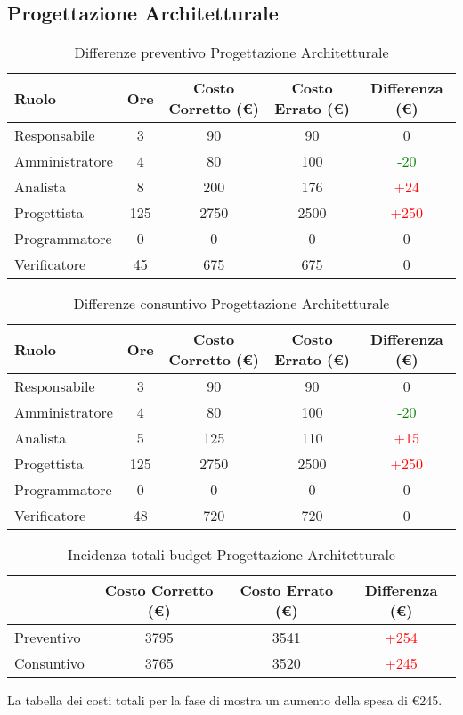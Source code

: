 \subsection{Progettazione Architetturale}
\begin{table}[h]
\begin{center}
\begin{tabular}{|l|c|c|c|c|}
\hline Ruolo & Ore & Costo Corretto (\euro) & Costo Errato (\euro) & Differenza (\euro) \\
\hline
Responsabile & 3 & 90  & 90 & 0\\
Amministratore & 4 & 80 & 100 & \textcolor{Green}{-20}\\
Analista &  8 & 200 & 176 & \textcolor{red}{+24}\\
Progettista & 125 & 2750 & 2500 & \textcolor{red}{+250}\\
Programmatore & 0 & 0 & 0 & 0\\
Verificatore & 45 & 675 & 675 & 0\\
\hline
\end{tabular}
\caption{Differenze preventivo Progettazione Architetturale}
\end{center}
\end{table}
\FloatBarrier
\begin{table}[h]
\begin{center}
\begin{tabular}{|l|c|c|c|c|}
\hline Ruolo & Ore & Costo Corretto (\euro) & Costo Errato (\euro) & Differenza (\euro)\\
\hline
Responsabile & 3 & 90 & 90 & 0\\
Amministratore & 4 & 80 & 100 & \textcolor{Green}{-20}\\
Analista & 5 & 125 & 110 & \textcolor{red}{+15}\\
Progettista & 125 & 2750 & 2500 & \textcolor{red}{+250}\\
Programmatore & 0 & 0 & 0 & 0\\
Verificatore & 48 & 720 & 720 & 0\\
\hline
\end{tabular}
\caption{Differenze consuntivo Progettazione Architetturale}
\end{center}
\end{table}
\FloatBarrier
\begin{table}[h]
\begin{center}
\begin{tabular}{|l|c|c|c|}
\hline & Costo Corretto (\euro) & Costo Errato (\euro) & Differenza (\euro)\\
\hline
Preventivo & 3795 & 3541& \textcolor{red}{+254}\\
Consuntivo &3765 & 3520& \textcolor{red}{+245}\\
\hline
\end{tabular}
\caption{Incidenza totali budget Progettazione Architetturale}
\end{center}
\end{table}
\FloatBarrier
La tabella dei costi totali per la fase di \fPA mostra un aumento della spesa di \euro245.
\newpage
